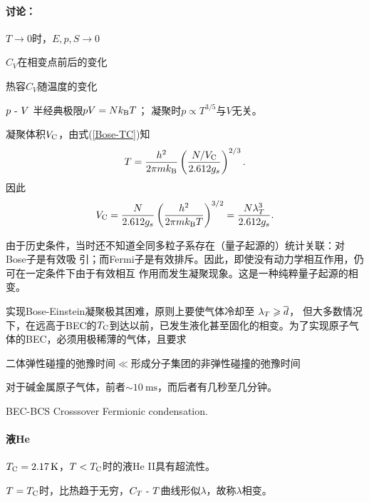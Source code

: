 \paragraph*{讨论：}
\begin{compactenum}
	\item $T\to 0$时，$E,p,S\to0$
	\item $C_V$在相变点前后的变化
	\begin{center}
		\tikzchap 热容$C_V$随温度的变化
	\end{center}
	\item $p~\text{-}~  V$
		\subitem 半经典极限$pV=Nk_{\mathrm B} T$；
		\subitem 凝聚时$p\propto T^{3/5}$与$V$无关。
	\item 凝聚体积$V_\mathrm C$，由式(\ref{Bose-TC})知
	\[
	T=\frac{h^2}{2\pi mk_{\mathrm B}}\left(\frac{N/V_\mathrm C}{2.612g_s}\right)^{2/3}.
\]
	因此 
	\begin{align}
		V_\mathrm C=\frac{N}{2.612g_s}\left(\frac{h^2}{2\pi mk_{\mathrm B} T}\right)^{3/2}=\frac{N\lambda_T^3}{2.612g_s}.
	\end{align}
\end{compactenum}
由于历史条件，当时还不知道全同多粒子系存在（量子起源的）统计关联：对Bose子是有效吸
引；而Fermi子是有效排斥。因此，即使没有动力学相互作用，仍可在一定条件下由于有效相互
作用而发生凝聚现象。这是一种纯粹量子起源的相变。

实现Bose-Einstein凝聚极其困难，原则上要使气体冷却至
$\lambda_T\geqslant\overline d$，
但大多数情况下，在远高于BEC的$T_\mathrm C$到达以前，已发生液化甚至固化的相变。为了实现原子气体的BEC，必须用极稀薄的气体，且要求
\begin{center}
	二体弹性碰撞的弛豫时间$\ll$形成分子集团的非弹性碰撞的弛豫时间
\end{center}
对于碱金属原子气体，前者$\sim\SI{10}\ms$，而后者有几秒至几分钟。%

BEC-BCS Crosssover Fermionic condensation.
\paragraph*{液He}$T_\crt=\SI{2.17}\K$，$T<T_\mathrm C$时的液He II具有超流性。

$T=T_\mathrm C$时，比热趋于无穷，$C_T~\text{-}~ T$曲线形似$\lambda$，故称$\lambda$相变。
